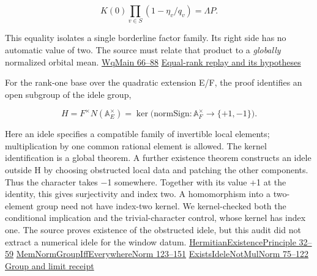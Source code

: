 \documentclass[11pt,letterpaper]{article}
\begin{document}
\[K(0)\prod_{v\in S}(1-\eta_v/q_v)=\Lambda P .\]

This equality isolates a single borderline factor family. Its right side has no automatic value of two. The source must relate that product to a \emph{globally} normalized orbital mean. \href{https://github.com/nousentllc/riemann-hypothesis/blob/40e56bab026552e089d7afcfeff08d2defb9c005/src/Development/WeilBound/CoreStatements/AutomorphicKernels/SiegelWeilFormula/WhittakerEqualRank/WqMain.lean\#L66-L88}{WqMain 66–88} \href{https://github.com/nousentllc/riemann-hypothesis/blob/2c03d15e908bcbe4aae3c94a87c7ada402cd7911/research/uriel/experiments/siegel-weil-constant-term/verification/README.md}{Equal-rank replay and its hypotheses}

For the rank-one base over the quadratic extension E/F, the proof identifies an open subgroup of the idele group,

\[H=F^\times N(\mathbb A_E^\times)
  =\ker\big(\mathrm{normSign}:\mathbb A_F^\times\longrightarrow\{+1,-1\}\big).\]

Here an idele specifies a compatible family of invertible local elements; multiplication by one common rational element is allowed. The kernel identification is a global theorem. A further existence theorem constructs an idele outside H by choosing obstructed local data and patching the other components. Thus the character takes \ensuremath{-}1 somewhere. Together with its value +1 at the identity, this gives surjectivity and index two. A homomorphism into a two-element group need not have index-two kernel. We kernel-checked both the conditional implication and the trivial-character control, whose kernel has index one. The source proves existence of the obstructed idele, but this audit did not extract a numerical idele for the window datum. \href{https://github.com/nousentllc/riemann-hypothesis/blob/40e56bab026552e089d7afcfeff08d2defb9c005/src/Development/AutomorphicSpectrum/Proofs/BlockDecomposition/HermitianExistencePrinciple.lean\#L32-L59}{HermitianExistencePrinciple 32–59} \href{https://github.com/nousentllc/riemann-hypothesis/blob/40e56bab026552e089d7afcfeff08d2defb9c005/src/Development/AbelianVarietyTheory/Proofs/IwasawaDecomposition/MemNormGroupIffEverywhereNorm.lean\#L123-L151}{MemNormGroupIffEverywhereNorm 123–151} \href{https://github.com/nousentllc/riemann-hypothesis/blob/40e56bab026552e089d7afcfeff08d2defb9c005/src/Development/AbelianVarietyTheory/Proofs/HeightProofs/ExistsIdeleNotMulNorm.lean\#L75-L122}{ExistsIdeleNotMulNorm 75–122} \href{https://github.com/nousentllc/riemann-hypothesis/blob/2c03d15e908bcbe4aae3c94a87c7ada402cd7911/research/uriel/experiments/siegel-weil-constant-term/normalization/receipt.json}{Group and limit receipt}
\end{document}
